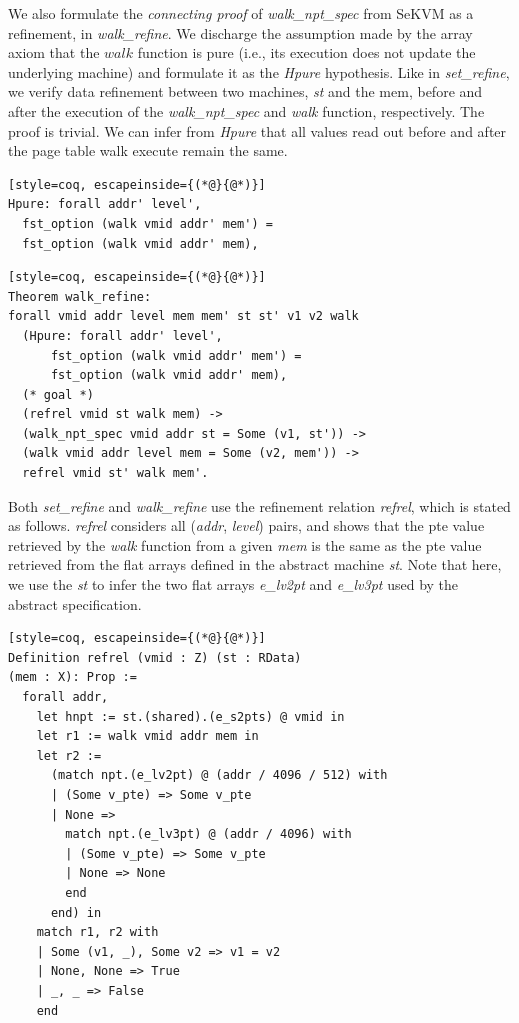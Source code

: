 We also formulate the \textit{connecting proof} of \textit{walk\_npt\_spec} from SeKVM as a refinement, in \textit{walk\_refine}. We discharge the assumption made by the array axiom that the $walk$ function is pure (i.e., its execution does not update the underlying machine) and formulate it as the \textit{Hpure} hypothesis. Like in \textit{set\_refine}, we verify data refinement between two machines, \textit{st} and the mem, before and after the execution of the \textit{walk\_npt\_spec} and \textit{walk} function, respectively. The proof is trivial. We can infer from \textit{Hpure} that all values read out before and after the page table walk execute remain the same. %

\begin{lstlisting}[style=coq, escapeinside={(*@}{@*)}]
Hpure: forall addr' level',
  fst_option (walk vmid addr' mem') = 
  fst_option (walk vmid addr' mem),
\end{lstlisting}

\begin{lstlisting}[style=coq, escapeinside={(*@}{@*)}]
Theorem walk_refine:
forall vmid addr level mem mem' st st' v1 v2 walk
  (Hpure: forall addr' level',
      fst_option (walk vmid addr' mem') = 
      fst_option (walk vmid addr' mem),
  (* goal *)
  (refrel vmid st walk mem) ->
  (walk_npt_spec vmid addr st = Some (v1, st')) ->
  (walk vmid addr level mem = Some (v2, mem')) ->
  refrel vmid st' walk mem'.
\end{lstlisting}

Both \textit{set\_refine} and \textit{walk\_refine} use the refinement relation \textit{refrel}, which is stated as follows. \textit{refrel} considers all (\textit{addr}, \textit{level}) pairs, and shows that the pte value retrieved by the \textit{walk} function from a given \textit{mem} is the same as the pte value retrieved from the flat arrays defined in the abstract machine \textit{st}. Note that here, we use the \textit{st} to infer the two flat arrays \textit{e\_lv2pt} and \textit{e\_lv3pt} used by the abstract specification.


\begin{lstlisting}[style=coq, escapeinside={(*@}{@*)}]
Definition refrel (vmid : Z) (st : RData)
(mem : X): Prop :=
  forall addr,
    let hnpt := st.(shared).(e_s2pts) @ vmid in
    let r1 := walk vmid addr mem in
    let r2 :=
      (match npt.(e_lv2pt) @ (addr / 4096 / 512) with
      | (Some v_pte) => Some v_pte
      | None =>
        match npt.(e_lv3pt) @ (addr / 4096) with
        | (Some v_pte) => Some v_pte
        | None => None
        end
      end) in
    match r1, r2 with
    | Some (v1, _), Some v2 => v1 = v2
    | None, None => True
    | _, _ => False
    end
\end{lstlisting}

